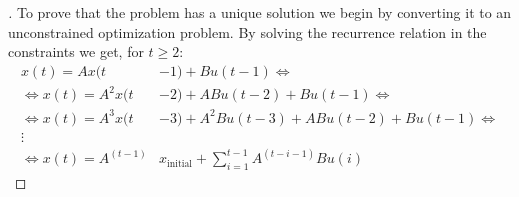 \documentclass[12pt]{article}
\begin{document}
\begin{proof}[\unskip\nopunct]
To prove that the problem has a unique solution we begin by converting it to an unconstrained optimization problem. By solving the recurrence relation in the constraints we get, for $ t \ge 2$:
\vspace{-0.1em}
\begin{align*}
    x(t)= Ax(t&-1) + Bu(t-1)
    \Leftrightarrow
    \\
    \Leftrightarrow
    x(t)= A^2x(t&-2) + ABu(t-2) + Bu(t-1)
    \Leftrightarrow
    \\
    \Leftrightarrow
    x(t)= A^3x(t&-3) + A^2Bu(t-3) + ABu(t - 2) + Bu(t-1)
    \Leftrightarrow
    \\
    \vdots
    \\
    \Leftrightarrow 
    x(t)= A^{(t-1)} & x_{\text{initial}} + \sum_{i=1}^{t-1} A^{(t - i - 1)}Bu(i)
\end{align*}


\end{proof}
\end{document}
